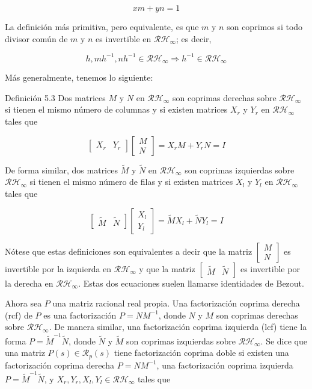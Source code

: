 $$
x m+y n=1
$$

La definición más primitiva, pero equivalente, es que $m$ y $n$ son coprimos si todo divisor común de $m$ y $n$ es invertible en $\mathcal{R} \mathcal{H}_{\infty}$; es decir,

$$
h, m h^{-1}, n h^{-1} \in \mathcal{R} \mathcal{H}_{\infty} \Longrightarrow h^{-1} \in \mathcal{R} \mathcal{H}_{\infty}
$$

Más generalmente, tenemos lo siguiente:

Definición 5.3 Dos matrices $M$ y $N$ en $\mathcal{R} \mathcal{H}_{\infty}$ son coprimas derechas sobre $\mathcal{R} \mathcal{H}_{\infty}$ si tienen el mismo número de columnas y si existen matrices $X_{r}$ y $Y_{r}$ en $\mathcal{R} \mathcal{H}_{\infty}$ tales que

$$
\left[\begin{array}{ll}
X_{r} & Y_{r}
\end{array}\right]\left[\begin{array}{l}
M \\
N
\end{array}\right]=X_{r} M+Y_{r} N=I
$$

De forma similar, dos matrices $\tilde{M}$ y $\tilde{N}$ en $\mathcal{R} \mathcal{H}_{\infty}$ son coprimas izquierdas sobre $\mathcal{R} \mathcal{H}_{\infty}$ si tienen el mismo número de filas y si existen matrices $X_{l}$ y $Y_{l}$ en $\mathcal{R} \mathcal{H}_{\infty}$ tales que

$$
\left[\begin{array}{ll}
\tilde{M} & \tilde{N}
\end{array}\right]\left[\begin{array}{c}
X_{l} \\
Y_{l}
\end{array}\right]=\tilde{M} X_{l}+\tilde{N} Y_{l}=I
$$

Nótese que estas definiciones son equivalentes a decir que la matriz $\left[\begin{array}{c}M \\ N\end{array}\right]$ es invertible por la izquierda en $\mathcal{R} \mathcal{H}_{\infty}$ y que la matriz $\left[\begin{array}{cc}\tilde{M} & \tilde{N}\end{array}\right]$ es invertible por la derecha en $\mathcal{R} \mathcal{H}_{\infty}$. Estas dos ecuaciones suelen llamarse identidades de Bezout.

Ahora sea $P$ una matriz racional real propia. Una factorización coprima derecha (rcf) de $P$ es una factorización $P=N M^{-1}$, donde $N$ y $M$ son coprimas derechas sobre $\mathcal{R} \mathcal{H}_{\infty}$. De manera similar, una factorización coprima izquierda (lcf) tiene la forma $P=\tilde{M}^{-1} \tilde{N}$, donde $\tilde{N}$ y $\tilde{M}$ son coprimas izquierdas sobre $\mathcal{R} \mathcal{H}_{\infty}$. Se dice que una matriz $P(s) \in \mathcal{R}_{p}(s)$ tiene factorización coprima doble si existen una factorización coprima derecha $P=N M^{-1}$, una factorización coprima izquierda $P=\tilde{M}^{-1} \tilde{N}$, y $X_{r}, Y_{r}, X_{l}, Y_{l} \in \mathcal{R} \mathcal{H}_{\infty}$ tales que

